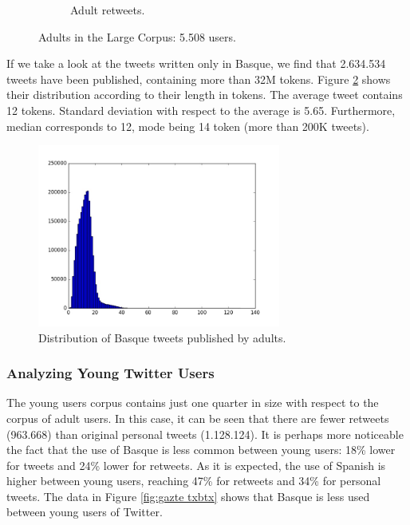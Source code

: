 \documentclass[information,article,submit,moreauthors,pdftex,10pt,a4paper]{Definitions/mdpi}
\begin{document}
\begin{figure}[H]
\begin{subfigure}[b]{0.48\linewidth}
    \caption{Adult retweets.}
  \end{subfigure}
  \caption{Adults in the Large Corpus: 5.508 users.}
  \label{fig:adults}
\end{figure}

If we take a look at the tweets written only in Basque, we find that 2.634.534 tweets have been published, containing more than 32M tokens. Figure  \ref{fig:txio luze held} shows their distribution according to their length in tokens. The average tweet contains 12 tokens. Standard deviation with respect to the average is 5.65. Furthermore, median corresponds to 12, mode being 14 token (more than 200K tweets).

\begin{figure}[H]
  \centering
  \includegraphics[height=6cm]{graf_for}
  \caption{Distribution of Basque tweets published by adults.}
  \label{fig:txio luze held}
\end{figure}

\subsubsection{Analyzing Young Twitter Users}

The young users corpus contains just one quarter in size with respect to the corpus of adult users. In this case, it can be seen that there are fewer retweets (963.668) than original personal tweets (1.128.124). It is perhaps more noticeable the fact that the use of Basque is less common between young users: 18\% lower for tweets and 24\% lower for retweets. As it is expected, the use of Spanish is higher between young users, reaching 47\% for retweets and 34\% for personal tweets. The data in Figure \ref{fig:gazte txbtx} shows that Basque is less used between young users of Twitter.
\end{document}
